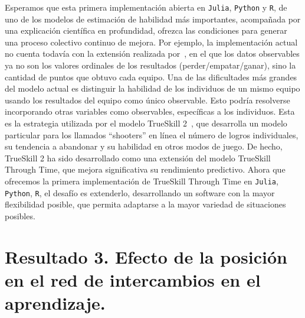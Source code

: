 \documentclass[a4paper,11pt]{book}
\theoremstyle{definition}
\begin{document}
Esperamos que esta primera implementaci\'on abierta en \texttt{Julia}, \texttt{Python} y \texttt{R}, de uno de los modelos de estimaci\'on de habilidad m\'as importantes, acompa\~nada por una explicaci\'on cient\'ifica en profundidad, ofrezca las condiciones para generar una proceso colectivo continuo de mejora.
%
Por ejemplo, la implementaci\'on actual no cuenta todav\'ia con la extensi\'on realizada por~\cite{Guo2012}, en el que los datos observables ya no son los valores ordinales de los resultados (perder/empatar/ganar), sino la cantidad de puntos que obtuvo cada equipo.
%
Una de las dificultades m\'as grandes del modelo actual es distinguir la habilidad de los individuos de un mismo equipo usando los resultados del equipo como \'unico observable.
%
Esto podr\'ia resolverse incorporando otras variables como observables, espec\'ificas a los individuos.
%
Esta es la estrategia utilizada por el modelo TrueSkill 2~\cite{minka2018-trueskill2}, que desarrolla un modelo particular para los llamados ``shooters'' en l\'inea el n\'umero de logros individuales, su tendencia a abandonar y su habilidad en otros modos de juego.
%
De hecho, TrueSkill 2 ha sido desarrollado como una extensi\'on del modelo TrueSkill Through Time, que mejora significativa su rendimiento predictivo.
%
Ahora que ofrecemos la primera implementaci\'on de TrueSkill Through Time en \texttt{Julia}, \texttt{Python}, \texttt{R}, el desaf\'io es extenderlo, desarrollando un software con la mayor flexibilidad posible, que permita adaptarse a la mayor variedad de situaciones posibles.
%
%











\chapter{Resultado 3. Efecto de la posici\'on en el red de intercambios en el aprendizaje.}\label{ch_topo}
\end{document}
